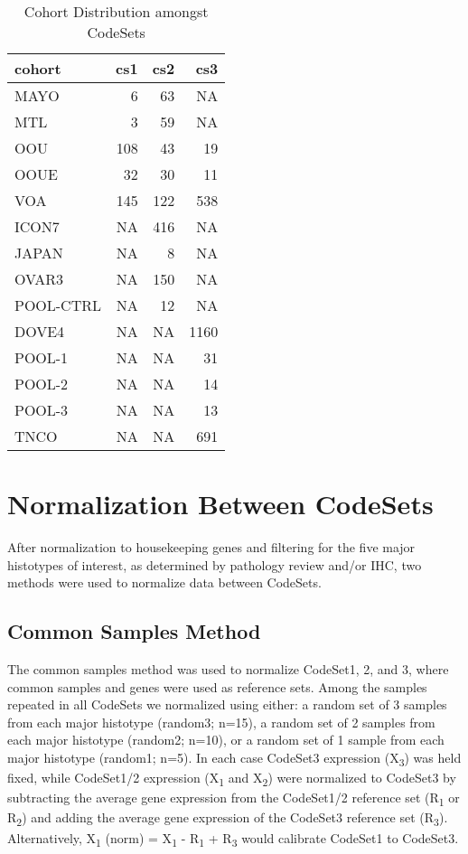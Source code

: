 \documentclass[
]{report}
\begin{document}
\begin{table}

\caption{\label{tab:cohort-dist}Cohort Distribution amongst CodeSets}
\centering
\begin{tabular}[t]{l|r|r|r}
\hline
cohort & cs1 & cs2 & cs3\\
\hline
MAYO & 6 & 63 & NA\\
\hline
MTL & 3 & 59 & NA\\
\hline
OOU & 108 & 43 & 19\\
\hline
OOUE & 32 & 30 & 11\\
\hline
VOA & 145 & 122 & 538\\
\hline
ICON7 & NA & 416 & NA\\
\hline
JAPAN & NA & 8 & NA\\
\hline
OVAR3 & NA & 150 & NA\\
\hline
POOL-CTRL & NA & 12 & NA\\
\hline
DOVE4 & NA & NA & 1160\\
\hline
POOL-1 & NA & NA & 31\\
\hline
POOL-2 & NA & NA & 14\\
\hline
POOL-3 & NA & NA & 13\\
\hline
TNCO & NA & NA & 691\\
\hline
\end{tabular}
\end{table}

\hypertarget{normalization-between-codesets}{%
\section{Normalization Between CodeSets}\label{normalization-between-codesets}}

After normalization to housekeeping genes and filtering for the five major histotypes of interest, as determined by pathology review and/or IHC, two methods were used to normalize data between CodeSets.

\hypertarget{common-samples-method}{%
\subsection{Common Samples Method}\label{common-samples-method}}

The common samples method was used to normalize CodeSet1, 2, and 3, where common samples and genes were used as reference sets. Among the samples repeated in all CodeSets we normalized using either: a random set of 3 samples from each major histotype (random3; n=15), a random set of 2 samples from each major histotype (random2; n=10), or a random set of 1 sample from each major histotype (random1; n=5). In each case CodeSet3 expression (X\textsubscript{3}) was held fixed, while CodeSet1/2 expression (X\textsubscript{1} and X\textsubscript{2}) were normalized to CodeSet3 by subtracting the average gene expression from the CodeSet1/2 reference set (R\textsubscript{1} or R\textsubscript{2}) and adding the average gene expression of the CodeSet3 reference set (R\textsubscript{3}). Alternatively, X\textsubscript{1} (norm) = X\textsubscript{1} - R\textsubscript{1} + R\textsubscript{3} would calibrate CodeSet1 to CodeSet3.
\end{document}
